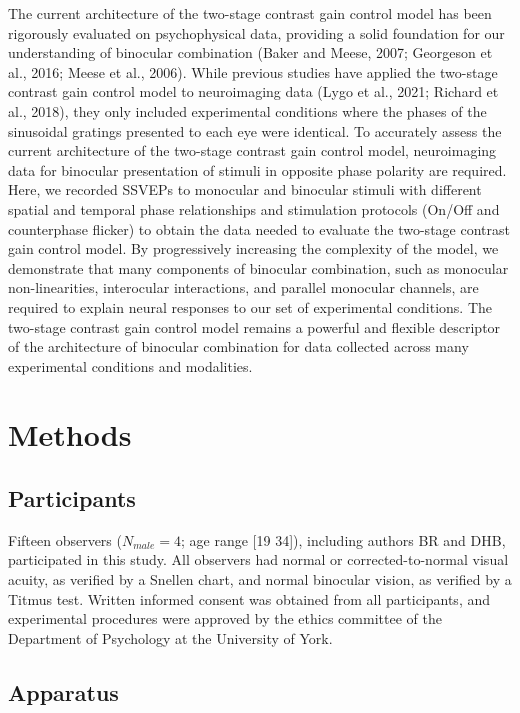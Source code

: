 \documentclass[
  12pt,
]{article}
\begin{document}
The current architecture of the two-stage contrast gain control model
has been rigorously evaluated on psychophysical data, providing a solid
foundation for our understanding of binocular combination (Baker and
Meese, 2007; Georgeson et al., 2016; Meese et al., 2006). While previous
studies have applied the two-stage contrast gain control model to
neuroimaging data (Lygo et al., 2021; Richard et al., 2018), they only
included experimental conditions where the phases of the sinusoidal
gratings presented to each eye were identical. To accurately assess the
current architecture of the two-stage contrast gain control model,
neuroimaging data for binocular presentation of stimuli in opposite
phase polarity are required. Here, we recorded SSVEPs to monocular and
binocular stimuli with different spatial and temporal phase
relationships and stimulation protocols (On/Off and counterphase
flicker) to obtain the data needed to evaluate the two-stage contrast
gain control model. By progressively increasing the complexity of the
model, we demonstrate that many components of binocular combination,
such as monocular non-linearities, interocular interactions, and
parallel monocular channels, are required to explain neural responses to
our set of experimental conditions. The two-stage contrast gain control
model remains a powerful and flexible descriptor of the architecture of
binocular combination for data collected across many experimental
conditions and modalities.

\section{Methods}\label{methods}

\subsection{Participants}\label{participants}

Fifteen observers (\(N_{male} = 4\); age range {[}19 34{]}), including
authors BR and DHB, participated in this study. All observers had normal
or corrected-to-normal visual acuity, as verified by a Snellen chart,
and normal binocular vision, as verified by a Titmus test. Written
informed consent was obtained from all participants, and experimental
procedures were approved by the ethics committee of the Department of
Psychology at the University of York.

\subsection{Apparatus}\label{apparatus}
\end{document}
